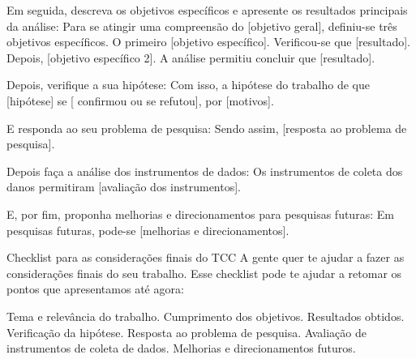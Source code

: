 Em seguida, descreva os objetivos específicos e apresente os resultados principais da análise:
Para se atingir uma compreensão do [objetivo geral], definiu-se três objetivos específicos. O primeiro [objetivo específico]. Verificou-se que [resultado]. Depois, [objetivo específico 2]. A análise permitiu concluir que [resultado].

Depois, verifique a sua hipótese:
Com isso, a hipótese do trabalho de que [hipótese] se [ confirmou ou se refutou], por [motivos].

E responda ao seu problema de pesquisa:
Sendo assim, [resposta ao problema de pesquisa].

Depois faça a análise dos instrumentos de dados:
Os instrumentos de coleta dos danos permitiram [avaliação dos instrumentos].

E, por fim, proponha melhorias e direcionamentos para pesquisas futuras:
Em pesquisas futuras, pode-se [melhorias e direcionamentos].

Checklist para as considerações finais do TCC
A gente quer te ajudar a fazer as considerações finais do seu trabalho. Esse checklist pode te ajudar a retomar os pontos que apresentamos até agora:

Tema e relevância do trabalho.
Cumprimento dos objetivos.
Resultados obtidos.
Verificação da hipótese.
Resposta ao problema de pesquisa.
Avaliação de instrumentos de coleta de dados. 
Melhorias e direcionamentos futuros. 
